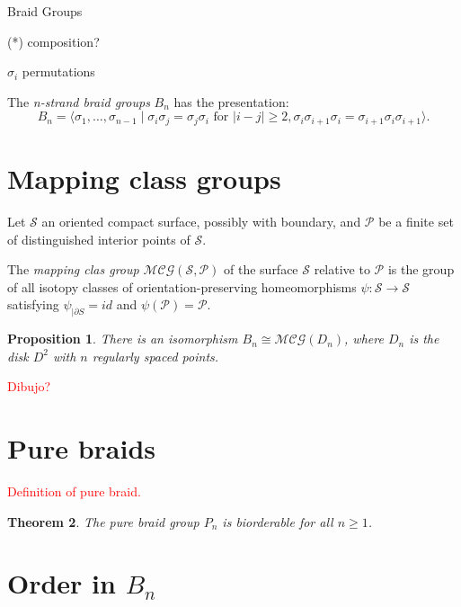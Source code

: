 \documentclass{article}
\newtheorem{theorem}{Theorem}[section]
\newtheorem{proposition}[theorem]{Proposition}
\theoremstyle{definition}
\newcounter{in}
\newcounter{ini}
\begin{document}
\begin{center}
\huge{Braid Groups}
\end{center}
\vspace{0.5cm}
\justify


(*) composition?

$\sigma_i$ permutations  

The \emph{n-strand braid groups} $B_n$ has the presentation:
\begin{equation*}
B_n=\langle\sigma_1,\dots,\sigma_{n-1}\mid \sigma_i\sigma_j=\sigma_j\sigma_i \mbox{ for } |i-j|\geq 2,\sigma_i\sigma_{i+1}\sigma_i=\sigma_{i+1}\sigma_i\sigma_{i+1}\rangle.
\end{equation*}

\section{Mapping class groups}

Let $\mathcal{S}$ an oriented compact surface, possibly with boundary, and $\mathcal{P}$ be a finite set of distinguished interior points of $\mathcal{S}$.

The \emph{mapping clas group} $\mathcal{MCG(S,P)}$ of the surface $\mathcal{S}$ relative to $\mathcal{P}$ is the group of all isotopy classes of orientation-preserving homeomorphisms $\psi:\mathcal{S}\rightarrow\mathcal{S}$ satisfying $\psi_{|\partial S}=id$ and $\psi(\mathcal{P})=\mathcal{P}$.

\begin{proposition}
	There is an isomorphism $B_n\cong \mathcal{MCG}(D_n)$, where $D_n$ is the disk $D^2$ with $n$ regularly spaced points.
\end{proposition}

\textcolor{red}{Dibujo?}

\section*{Pure braids}

\textcolor{red}{Definition of pure braid.}

\begin{theorem}
The pure braid group $P_n$ is biorderable for all $n\geq 1$.
\end{theorem}


\section*{Order in $B_n$}


\end{document}
